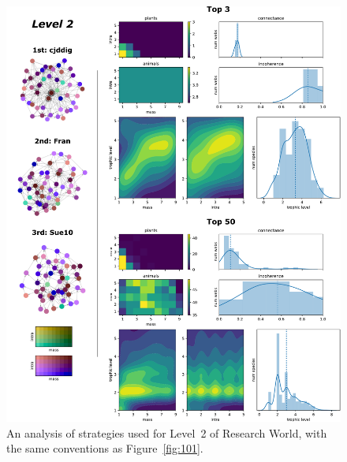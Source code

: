 \begin{figure}
  \centering
  \includegraphics[height=.85\textheight, right]{joy/102.pdf}
  \caption[Results from Research World Level~2]{An analysis of strategies used for Level~2 of Research World, with the same conventions as Figure~\ref{fig:101}.}
  \label{fig:102}
\end{figure}
